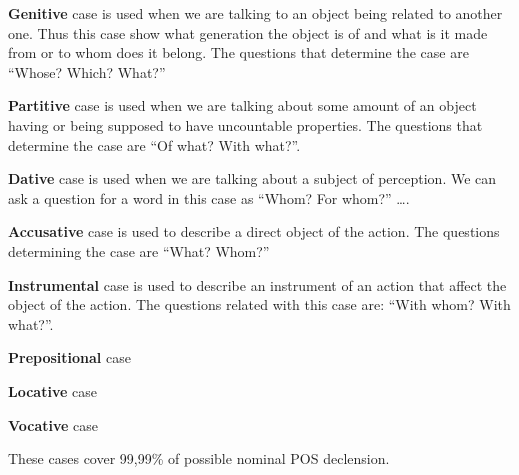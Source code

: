 \textbf{Genitive} case is used when we are talking to an object being related to another one. Thus this case show what generation the object is of and what is it made from or to whom does it belong. The questions that determine the case are “Whose? Which? What?”

\textbf{Partitive} case is used when we are talking about some amount of an object having or being supposed to have uncountable properties. The questions that determine the case are “Of what? With what?”. 

\textbf{Dative} case is used when we are talking about a subject of perception. We can ask a question for a word in this case as “Whom? For whom?”  …. 

\textbf{Accusative} case is used to describe a direct object of the action. The questions determining the case are “What? Whom?”

\textbf{Instrumental} case is used to describe an instrument of an action that affect the object of the action. The questions related with this case are: “With whom? With what?”.

\textbf{Prepositional} case 

\textbf{Locative} case

\textbf{Vocative} case

These cases cover 99,99\% of possible nominal POS declension.  
